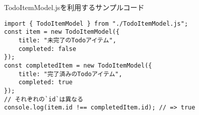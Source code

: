 \begin{listtitle}
TodoItemModel.jsを利用するサンプルコード
\end{listtitle}
\begin{lstlisting}
import { TodoItemModel } from "./TodoItemModel.js";
const item = new TodoItemModel({
    title: "未完了のTodoアイテム",
    completed: false
});
const completedItem = new TodoItemModel({
    title: "完了済みのTodoアイテム",
    completed: true
});
// それぞれの`id`は異なる
console.log(item.id !== completedItem.id); // => true
\end{lstlisting}
\listend
